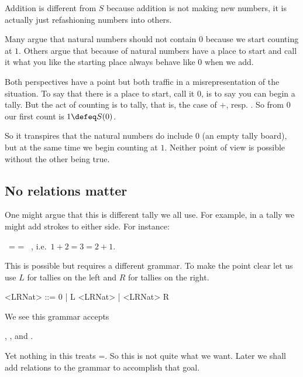 Addition is different from $S$ because addition is not making new 
numbers, it is actually just refashioning numbers into others.  


\begin{remark}
    Many argue that natural numbers should not contain $0$ because we start counting 
    at $1$.  Others argue that because of natural numbers have a place to start 
    and call it what you like the starting place always behave like $0$ when we add.

    Both perspectives have a point but both traffic in a misrepresentation of the 
    situation.  To say that there is a place to start, call it 0, is to say 
    you can begin a tally.  But the act of counting is to tally, that is, the case 
    of $+$, resp. . So from $0$ our first count is $1\defeq S(0)$. 
    
    So it transpires that the
    natural numbers do include $0$ (an empty tally board), but at the same time
    we begin counting at $1$.  Neither point of view is possible without the other
    being true.
\end{remark}


\subsection{No relations matter}

One might argue that this is different tally we all use.  For example, in a tally we might 
add strokes to either side.  For instance:
\begin{center}
    \StrokeOne~\StrokeTwo = \StrokeThree = \StrokeTwo~\StrokeOne,
    i.e.\ $1+2=3=2+1$.
\end{center}
This is possible but requires a different grammar.  To make the point clear let us 
use $L$ for tallies on the left and $R$ for tallies on the right.
\begin{center}
\begin{gcode}[]
<LRNat> ::= 0 
         | L <LRNat>
         | <LRNat> R
\end{gcode}
\end{center}
We see this grammar accepts
\begin{center}
    , , and .
\end{center}
Yet nothing in this treats =.  So this is not quite what we 
want.  Later we shall add relations to the grammar to accomplish that goal.
    

